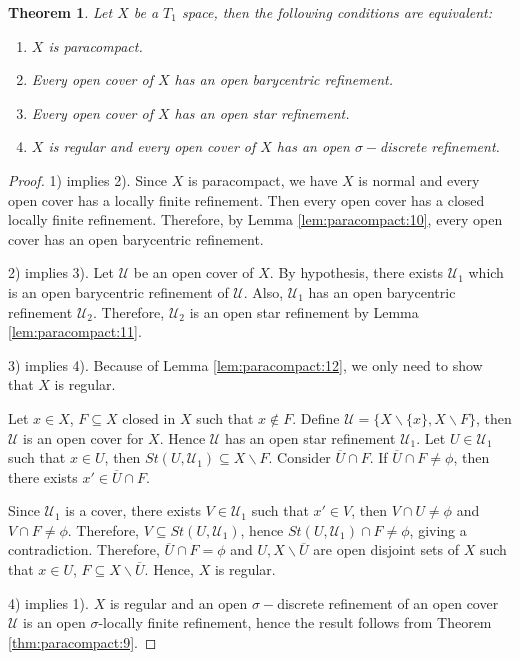\documentclass[12pt,oneside,english]{amsbook}
\numberwithin{equation}{section} %
\numberwithin{figure}{section} %
\theoremstyle{plain}
\numberwithin{section}{chapter}
\newtheorem{thm}{Theorem}[section]
\theoremstyle{plain}
\begin{document}
\begin{thm} \label{thm:paracompact:13}
  Let $X$ be a $T_{1}$ space, then the following conditions are equivalent:
  \begin{enumerate}
  \item $X$ is paracompact.
  \item Every open cover of $X$ has an open barycentric refinement.
  \item Every open cover of $X$ has an open star refinement.
  \item $X$ is regular and every open cover of $X$ has an open $\sigma-$discrete refinement.
  \end{enumerate}
\end{thm}
\begin{proof}
  1) implies 2). Since $X$ is paracompact, we have $X$ is normal and every open cover has a locally finite refinement. Then every open cover has a closed locally finite refinement. Therefore, by Lemma \ref{lem:paracompact:10}, every open cover has an open barycentric refinement.

  2) implies 3). Let $\mathcal{U}$ be an open cover of $X$. By hypothesis, there exists $\mathcal{U}_{1}$ which is an open barycentric refinement of $\mathcal{U}$. Also, $\mathcal{U}_{1}$ has an open barycentric refinement $\mathcal{U}_{2}$. Therefore, $\mathcal{U}_{2}$ is an open star refinement by Lemma \ref{lem:paracompact:11}.

  3) implies 4). Because of Lemma \ref{lem:paracompact:12}, we only need to show that $X$ is regular.

  Let $x \in X$, $F \subseteq X$ closed in $X$ such that $x \notin F$. Define $\mathcal{U} = \{X \backslash\{x\}, X \backslash F \}$, then $\mathcal{U}$ is an open cover for $X$. Hence $\mathcal{U}$ has an open star refinement $\mathcal{U}_{1}$. Let $U \in \mathcal{U}_{1}$ such that $x \in U$, then $St(U,\mathcal{U}_{1}) \subseteq X \backslash F$. Consider $\overline{U} \cap F$. If $\overline{U} \cap F \neq \phi$, then there exists $x' \in \overline{U} \cap F$.

  Since $\mathcal{U}_{1}$ is a cover, there exists $V \in \mathcal{U}_{1}$ such that $x' \in V$, then $V \cap U \neq \phi$ and $V \cap F \neq \phi$. Therefore, $V \subseteq St(U, \mathcal{U}_{1})$, hence $St(U,\mathcal{U}_{1}) \cap F \neq \phi$, giving a contradiction. Therefore, $\overline{U} \cap F = \phi$ and $U,X \backslash \overline{U}$ are open disjoint sets of $X$ such that $x \in U$, $F \subseteq X \backslash \overline{U}$. Hence, $X$ is regular.

  4) implies 1). $X$ is regular and an open $\sigma-$discrete refinement of an open cover $\mathcal{U}$ is an open $\sigma$-locally finite refinement, hence the result follows from Theorem \ref{thm:paracompact:9}.
\end{proof}
\end{document}

